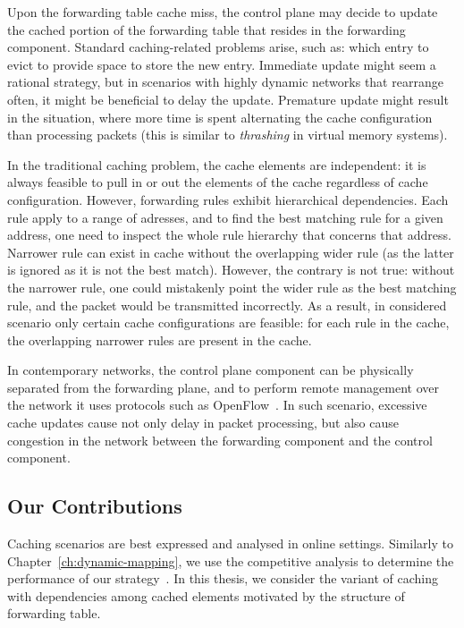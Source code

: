 Upon the forwarding table cache miss, the control plane may decide to update the cached portion of the forwarding table that resides in the forwarding component.
Standard caching-related problems arise, such as: which entry to evict to provide space to store the new entry.
Immediate update might seem a rational strategy, but in scenarios with highly dynamic networks that rearrange often, it might be beneficial to delay the update.
Premature update might result in the situation, where more time is spent alternating the cache configuration than processing packets (this is similar to \emph{thrashing} in virtual memory systems).

In the traditional caching problem, the cache elements are independent: it is always feasible to pull in or out the elements of the cache regardless of cache configuration.
However, forwarding rules exhibit hierarchical dependencies.
Each rule apply to a range of adresses, and to find the best matching rule for a given address, one need to inspect the whole rule hierarchy that concerns that address.
Narrower rule can exist in cache without the overlapping wider rule (as the latter is ignored as it is not the best match).
However, the contrary is not true: without the narrower rule, one could mistakenly point the wider rule as the best matching rule, and the packet would be transmitted incorrectly.
As a result, in considered scenario only certain cache configurations are feasible: for each rule in the cache, the overlapping narrower rules are present in the cache.


In contemporary networks, the control plane component can be physically separated from the forwarding plane, and to perform remote management over the network it uses protocols such as OpenFlow~\cite{openflow}.
In such scenario, excessive cache updates cause not only delay in packet processing, but also cause congestion in the network between the forwarding component and the control component.

\subsection{Our Contributions}


Caching scenarios are best expressed and analysed in online settings.
Similarly to Chapter~\ref{ch:dynamic-mapping}, we use the competitive analysis to determine the performance of our strategy~\cite{borodin-book}.
In this thesis, we consider the variant of caching with dependencies among cached elements motivated by the structure of forwarding table.

